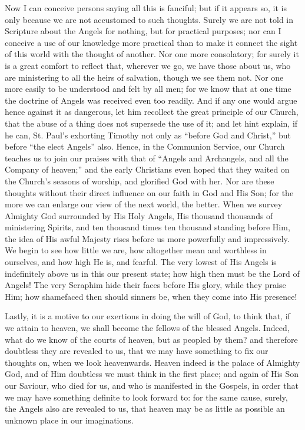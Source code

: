 Now I can conceive persons saying all this is fanciful; but if it
appears so, it is only because we are not accustomed to such thoughts.
Surely we are not told in Scripture about the Angels for nothing, but
for practical purposes; nor can I conceive a use of our knowledge more
practical than to make it connect the sight of this world with the
thought of another. Nor one more consolatory; for surely it is a great
comfort to reflect that, wherever we go, we have those about us, who are
ministering to all the heirs of salvation, though we see them not. Nor
one more easily to be understood and felt by all men; for we know that
at one time the doctrine of Angels was received even too readily. And if
any one would argue hence against it as dangerous, let him recollect the
great principle of our Church, that the abuse of a thing does not
supersede the use of it; and let hint explain, if he can, St. Paul's
exhorting Timothy not only as ``before God and Christ,'' but
before ``the elect Angels'' also. Hence, in the Communion
Service, our Church teaches us to join our praises with that of
``Angels and Archangels, and all the Company of heaven;'' and
the early Christians even hoped that they waited on the Church's seasons
of worship, and glorified God with her. Nor are these thoughts without
their direct influence on our faith in God and His Son; for the more we
can enlarge our view of the next world, the better. When we survey
Almighty God surrounded by His Holy Angels, His thousand thousands of
ministering Spirits, and ten thousand times ten thousand standing before
Him, the idea of His awful Majesty rises before us more powerfully and
impressively. We begin to see how little we are, how altogether mean and
worthless in ourselves, and how high He is, and fearful. The very lowest
of His Angels is indefinitely above us in this our present state; how
high then must be the Lord of Angels! The very Seraphim hide their faces
before His glory, while they praise Him; how shamefaced then should
sinners be, when they come into His presence!

Lastly, it is a motive to our exertions in doing the will of God, to
think that, if we attain to heaven, we shall become the fellows of the
blessed Angels. Indeed, what do we know of the courts of heaven, but as
peopled by them? and therefore doubtless they are revealed to us, that
we may have something to fix our thoughts on, when we look heavenwards.
Heaven indeed is the palace of Almighty God, and of Him doubtless we
must think in the first place; and again of His Son our Saviour, who
died for us, and who is manifested in the Gospels, in order that we may
have something definite to look forward to: for the same cause, surely,
the Angels also are revealed to us, that heaven may be as little as
possible an unknown place in our imaginations.


